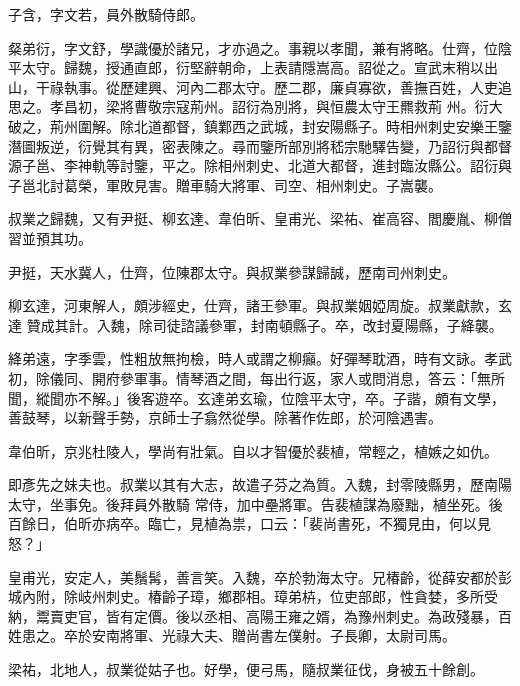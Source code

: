 \begin{pinyinscope}
 子含，字文若，員外散騎侍郎。



 粲弟衍，字文舒，學識優於諸兄，才亦過之。事親以孝聞，兼有將略。仕齊，位陰平太守。歸魏，授通直郎，衍堅辭朝命，上表請隱嵩高。詔從之。宣武末稍以出山，干祿執事。從歷建興、河內二郡太守。歷二郡，廉貞寡欲，善撫百姓，人吏追思之。孝昌初，梁將曹敬宗寇荊州。詔衍為別將，與恒農太守王羆救荊
 州。衍大破之，荊州圍解。除北道都督，鎮鄴西之武城，封安陽縣子。時相州刺史安樂王鑒潛圖叛逆，衍覺其有異，密表陳之。尋而鑒所部別將嵇宗馳驛告變，乃詔衍與都督源子邕、李神軌等討鑒，平之。除相州刺史、北道大都督，進封臨汝縣公。詔衍與子邕北討葛榮，軍敗見害。贈車騎大將軍、司空、相州刺史。子嵩襲。



 叔業之歸魏，又有尹挺、柳玄達、韋伯昕、皇甫光、梁祐、崔高容、閻慶胤、柳僧習並預其功。



 尹挺，天水冀人，仕齊，位陳郡太守。與叔業參謀歸誠，歷南司州刺史。



 柳玄達，河東解人，頗涉經史，仕齊，諸王參軍。與叔業姻婭周旋。叔業獻款，玄達
 贊成其計。入魏，除司徒諮議參軍，封南頓縣子。卒，改封夏陽縣，子絳襲。



 絳弟遠，字季雲，性粗放無拘檢，時人或謂之柳癲。好彈琴耽酒，時有文詠。孝武初，除儀同、開府參軍事。情琴酒之間，每出行返，家人或問消息，答云：「無所聞，縱聞亦不解。」後客遊卒。玄達弟玄瑜，位陰平太守，卒。子諧，頗有文學，善鼓琴，以新聲手勢，京師士子翕然從學。除著作佐郎，於河陰遇害。



 韋伯昕，京兆杜陵人，學尚有壯氣。自以才智優於裴植，常輕之，植嫉之如仇。



 即彥先之妹夫也。叔業以其有大志，故遣子芬之為質。入魏，封零陵縣男，歷南陽太守，坐事免。後拜員外散騎
 常侍，加中壘將軍。告裴植謀為廢黜，植坐死。後百餘日，伯昕亦病卒。臨亡，見植為祟，口云：「裴尚書死，不獨見由，何以見怒？」



 皇甫光，安定人，美鬚髯，善言笑。入魏，卒於勃海太守。兄椿齡，從薛安都於彭城內附，除岐州刺史。椿齡子璋，鄉郡相。璋弟枿，位吏部郎，性貪婪，多所受納，鬻賣吏官，皆有定價。後以丞相、高陽王雍之婿，為豫州刺史。為政殘暴，百姓患之。卒於安南將軍、光祿大夫、贈尚書左僕射。子長卿，太尉司馬。



 梁祐，北地人，叔業從姑子也。好學，便弓馬，隨叔業征伐，身被五十餘創。




\end{pinyinscope}
